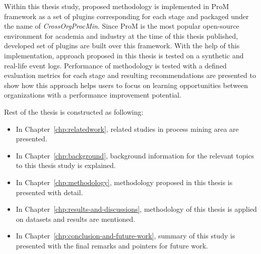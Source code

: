 Within this thesis study, proposed methodology is implemented in ProM framework \cite{verbeek2010prom} as a set of plugins corresponding for each stage and packaged under the name of \textit{CrossOrgProcMin}. Since ProM is the most popular open-source environment for academia and industry at the time of this thesis published, developed set of plugins are built over this framework. With the help of this implementation, approach proposed in this thesis is tested on a synthetic and real-life event logs. Performance of methodology is tested with a defined evaluation metrics for each stage and resulting recommendations are presented to show how this approach helps users to focus on learning opportunities between organizations with a performance improvement potential. 

Rest of the thesis is constructed as following:
\begin{itemize}
	\item In Chapter~\ref{chp:relatedwork}, related studies in process mining area are presented. 
	\item In Chapter~\ref{chp:background}, background information for the relevant topics to this thesis study is explained.
	\item In Chapter~\ref{chp:methodology}, methodology proposed in this thesis is presented with detail.
	\item In Chapter~\ref{chp:results-and-discussions}, methodology of this thesis is applied on datasets and results are mentioned.
	\item In Chapter~\ref{chp:conclusion-and-future-work}, summary of this study is presented with the final remarks and pointers for future work. 
\end{itemize}


